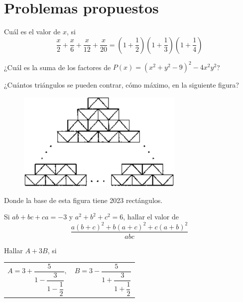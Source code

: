 \section{Problemas propuestos}

\begin{section-problem}
    Cuál es el valor de $x$, si
    \[\frac{x}{2} + \frac{x}{6} + \frac{x}{12} + \frac{x}{20} = \left(1 + \frac{1}{2}\right)\left(1 + \frac{1}{3}\right)\left(1 + \frac{1}{4}\right)\]
\end{section-problem}

\begin{section-problem}
    ¿Cuál es la suma de los factores de $P(x) = (x^2 + y^2 - 9)^2 - 4x^2 y^2$?
\end{section-problem}

\begin{section-problem}
    ¿Cuántos triángulos se pueden contrar, cómo máximo, en la siguiente figura?
    \begin{figure}[htb]
        \centering
        \includegraphics[width=8cm]{images/figura}
    \end{figure}

    Donde la base de esta figura tiene 2023 rectángulos.
\end{section-problem}

\begin{section-problem}
    Si $ab + bc + ca = -3$ y $a^2 + b^2 + c^2 = 6$, hallar el valor de
    \[\frac{a(b + c)^2 + b(a + c)^2 + c(a + b)^2}{abc}\]
\end{section-problem}


\begin{section-problem}
    Hallar $A + 3B$, si
    \begin{table}[H]
        \centering
        \begin{tabular}{p{4cm} p{4cm}}
            $A = 3 + \dfrac{5}{1 - \dfrac{3}{1 - \dfrac{1}{2}}},$
            &
            $B = 3 - \dfrac{5}{1 + \dfrac{3}{1 + \dfrac{1}{2}}}$
        \end{tabular}
    \end{table}
\end{section-problem}

